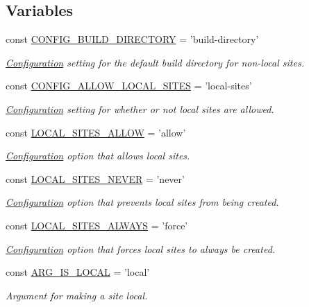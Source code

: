 \subsection*{Variables}
\begin{DoxyCompactItemize}
\item 
const \hyperlink{group__config_ga4b310f9950b16bab770394d65f81ec26}{C\-O\-N\-F\-I\-G\-\_\-\-B\-U\-I\-L\-D\-\_\-\-D\-I\-R\-E\-C\-T\-O\-R\-Y} = 'build-\/directory'
\begin{DoxyCompactList}\small\item\em \hyperlink{classConfiguration}{Configuration} setting for the default build directory for non-\/local sites. \end{DoxyCompactList}\item 
const \hyperlink{group__config_gacf40761d602f54e08ec28ee36cb85c5f}{C\-O\-N\-F\-I\-G\-\_\-\-A\-L\-L\-O\-W\-\_\-\-L\-O\-C\-A\-L\-\_\-\-S\-I\-T\-E\-S} = 'local-\/sites'
\begin{DoxyCompactList}\small\item\em \hyperlink{classConfiguration}{Configuration} setting for whether or not local sites are allowed. \end{DoxyCompactList}\item 
const \hyperlink{group__local__site__options_ga36d64963016f0065c0b9b5eddd333d8f}{L\-O\-C\-A\-L\-\_\-\-S\-I\-T\-E\-S\-\_\-\-A\-L\-L\-O\-W} = 'allow'
\begin{DoxyCompactList}\small\item\em \hyperlink{classConfiguration}{Configuration} option that allows local sites. \end{DoxyCompactList}\item 
const \hyperlink{group__local__site__options_ga367f4249eff6d5bff038aec1cfdb16bc}{L\-O\-C\-A\-L\-\_\-\-S\-I\-T\-E\-S\-\_\-\-N\-E\-V\-E\-R} = 'never'
\begin{DoxyCompactList}\small\item\em \hyperlink{classConfiguration}{Configuration} option that prevents local sites from being created. \end{DoxyCompactList}\item 
const \hyperlink{group__local__site__options_ga0b19cf86b69f53eb2decd943ebe31d19}{L\-O\-C\-A\-L\-\_\-\-S\-I\-T\-E\-S\-\_\-\-A\-L\-W\-A\-Y\-S} = 'force'
\begin{DoxyCompactList}\small\item\em \hyperlink{classConfiguration}{Configuration} option that forces local sites to always be created. \end{DoxyCompactList}\item 
const \hyperlink{group__args_gab4bc1e3dae7e4e4c739fd5f257a43aae}{A\-R\-G\-\_\-\-I\-S\-\_\-\-L\-O\-C\-A\-L} = 'local'
\begin{DoxyCompactList}\small\item\em Argument for making a site local. \end{DoxyCompactList}\end{DoxyCompactItemize}
